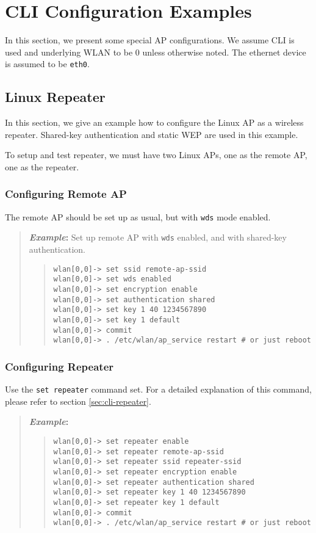 \documentclass[10pt,fullpage]{article}
\newcommand{\mytt}[1]{{\texttt{#1}}}
\newcommand{\bv}{\begin{verse}}
\newcommand{\ev}{\end{verse}}
\newcommand{\cliparam}[1]{{\texttt{#1}}}
\newcommand{\clidemo}[1]{{\texttt{wlan[0,0]-> #1}}}
\newenvironment{example}{\begin{quote}\textbf{\textit{Example}:}}{\end{quote}}
\begin{document}
\section{CLI Configuration Examples}
In this section, we present some special AP configurations. We assume
CLI is used and underlying WLAN to be 0 unless otherwise noted. The
ethernet device is assumed to be \mytt{eth0}.

\subsection{Linux Repeater}
\label{sec:cli-repeater-example}
In this section, we give an example how to configure the Linux AP as
a wireless repeater. Shared-key authentication and static WEP are
used in this example.

To setup and test repeater, we must have two Linux APs, one as the
remote AP, one as the repeater.

\subsubsection{Configuring Remote AP}
The remote AP should be set up as usual, but with \cliparam{wds} mode
enabled.
\begin{example}
  Set up remote AP with \cliparam{wds} enabled, and with shared-key
authentication.
  \bv
  \clidemo{set ssid remote-ap-ssid}\\
  \clidemo{set wds enabled}\\
  \clidemo{set encryption enable}\\
  \clidemo{set authentication shared}\\
  \clidemo{set key 1 40 1234567890}\\
  \clidemo{set key 1 default}\\
  \clidemo{commit}\\
  \clidemo{.  /etc/wlan/ap\_service restart        \# or just reboot}
  \ev
\end{example}

\subsubsection{Configuring Repeater}
Use the \mytt{set repeater} command set. For a detailed explanation
of this command, please refer to section \ref{sec:cli-repeater}.
\begin{example}
  \bv
  \clidemo{set repeater enable}\\
  \clidemo{set repeater remote-ap-ssid}\\
  \clidemo{set repeater ssid repeater-ssid}\\
  \clidemo{set repeater encryption enable}\\
  \clidemo{set repeater authentication shared}\\
  \clidemo{set repeater key 1 40 1234567890}\\
  \clidemo{set repeater key 1 default}\\
  \clidemo{commit}\\
  \clidemo{.  /etc/wlan/ap\_service restart        \# or just reboot}
  \ev
\end{example}
\end{document}
